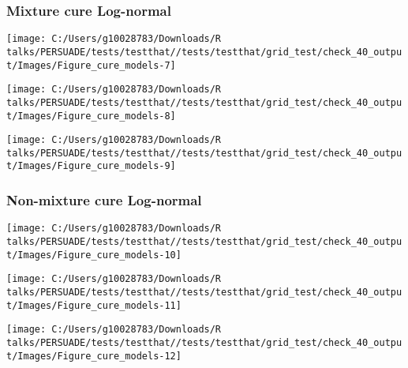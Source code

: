 \documentclass[
]{article}
\begin{document}
\clearpage

\subsubsection{Mixture cure Log-normal}\label{mixture-cure-log-normal}

\begin{flushleft}\texttt{[image: C:/Users/g10028783/Downloads/R talks/PERSUADE/tests/testthat//tests/testthat/grid\_test/check\_40\_output/Images/Figure\_cure\_models-7]} \end{flushleft}

\begin{flushleft}\texttt{[image: C:/Users/g10028783/Downloads/R talks/PERSUADE/tests/testthat//tests/testthat/grid\_test/check\_40\_output/Images/Figure\_cure\_models-8]} \end{flushleft}

\begin{flushleft}\texttt{[image: C:/Users/g10028783/Downloads/R talks/PERSUADE/tests/testthat//tests/testthat/grid\_test/check\_40\_output/Images/Figure\_cure\_models-9]} \end{flushleft}

\clearpage

\subsubsection{Non-mixture cure
Log-normal}\label{non-mixture-cure-log-normal}

\begin{flushleft}\texttt{[image: C:/Users/g10028783/Downloads/R talks/PERSUADE/tests/testthat//tests/testthat/grid\_test/check\_40\_output/Images/Figure\_cure\_models-10]} \end{flushleft}

\begin{flushleft}\texttt{[image: C:/Users/g10028783/Downloads/R talks/PERSUADE/tests/testthat//tests/testthat/grid\_test/check\_40\_output/Images/Figure\_cure\_models-11]} \end{flushleft}

\begin{flushleft}\texttt{[image: C:/Users/g10028783/Downloads/R talks/PERSUADE/tests/testthat//tests/testthat/grid\_test/check\_40\_output/Images/Figure\_cure\_models-12]} \end{flushleft}
\end{document}
